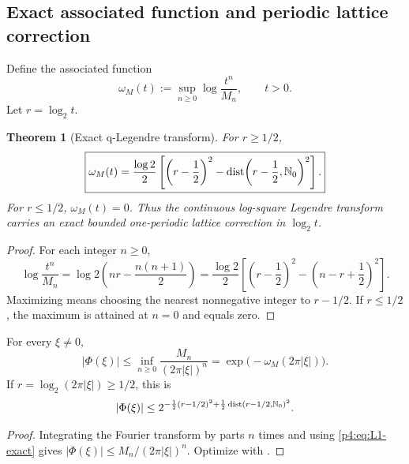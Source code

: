 \documentclass[11pt,oneside]{article}
\newtheorem{theorem}{Theorem}[section]
\theoremstyle{definition}
\theoremstyle{remark}
\newcommand{\N}{\mathbb N}
\begin{document}
\subsection{Exact associated function and periodic lattice correction}

Define the associated function
\begin{equation}
 \omega_M(t):=\sup_{n\geq0}\log\frac{t^n}{M_n},
 \qquad t>0.
 \label{p4:eq:associated-function}
\end{equation}
Let $r=\log_2t$.

\begin{theorem}[Exact q-Legendre transform]
\label{p4:thm:q-Legendre}
For $r\geq1/2$,
\begin{equation}
 \boxed{
 \omega_M(t)=\frac{\log2}{2}
 \left[
 \left(r-\frac12\right)^2
 -\dist\!\left(r-\frac12,\N_0\right)^2
 \right].}
 \label{p4:eq:q-Legendre}
\end{equation}
For $r\leq1/2$, $\omega_M(t)=0$.  Thus the continuous log-square Legendre transform carries
an exact bounded one-periodic lattice correction in $\log_2t$.
\end{theorem}

\begin{proof}
For each integer $n\geq0$,
\[
 \log\frac{t^n}{M_n}
 =\log2\left(nr-\frac{n(n+1)}2\right)
 =\frac{\log2}{2}\left[
 \left(r-\frac12\right)^2-
 \left(n-r+\frac12\right)^2\right].
\]
Maximizing means choosing the nearest nonnegative integer to $r-1/2$.  If $r\leq1/2$, the
maximum is attained at $n=0$ and equals zero.
\end{proof}

\begin{corollary}
\label{p4:cor:IBP-envelope}
For every $\xi\neq0$,
\begin{equation}
 \boxed{
 |\Phi(\xi)|
 \leq\inf_{n\geq0}\frac{M_n}{(2\pi|\xi|)^n}
 =\exp\bigl(-\omega_M(2\pi|\xi|)\bigr).}
 \label{p4:eq:IBP-envelope}
\end{equation}
If $r=\log_2(2\pi|\xi|)\geq1/2$, this is
\begin{equation}
 |\Phi(\xi)|\leq
 2^{-\frac12(r-1/2)^2+\frac12\dist(r-1/2,\N_0)^2}.
 \label{p4:eq:explicit-IBP-envelope}
\end{equation}
\end{corollary}

\begin{proof}
Integrating the Fourier transform by parts $n$ times and using
\eqref{p4:eq:L1-exact} gives
$|\Phi(\xi)|\leq M_n/(2\pi|\xi|)^n$.  Optimize with
.
\end{proof}
\end{document}
